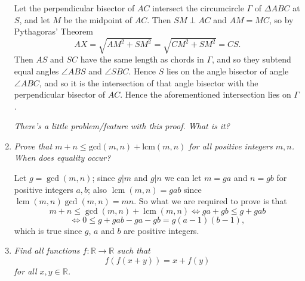 \documentclass{article}
\DeclareMathOperator{\lcm}{lcm}
\begin{document}
\begin{enumerate}[1.]
Let the perpendicular bisector of $AC$ intersect the circumcircle $\Gamma$ of $\Delta ABC$ at $S$, and let $M$ be the midpoint of $AC$. Then $SM \perp AC$ and $AM = MC$, so by Pythagoras' Theorem \[ AX = \sqrt{AM^2+SM^2} = \sqrt{CM^2+SM^2} = CS. \]
Then $AS$ and $SC$ have the same length as chords in $\Gamma$, and so they subtend equal angles $\angle ABS$ and $\angle SBC$. Hence $S$ lies on the angle bisector of angle $\angle ABC$, and so it is the intersection of that angle bisector with the perpendicular bisector of $AC$. Hence the aforementioned intersection lies on $\Gamma$.

\begin{figure}[htb!] \begin{center}
\end{center} \end{figure}

{\footnotesize \textit{There's a little problem/feature with this proof. What is it?}}


\vspace{12pt}
\item %
\textit{Prove that $m + n \leq \textrm{gcd}(m, n) + \textrm{lcm}(m, n)$ for all positive integers $m, n$. When does equality occur?}

Let $g = \gcd(m,n)$; since $g | m$ and $g | n$ we can let $m = ga$ and $n = gb$ for positive integers $a,b$; also $\lcm(m,n) = gab$ since $\lcm(m,n) \gcd(m,n) = mn$. So what we are required to prove is that \[ m+n \leq \gcd(m,n)+\lcm(m,n) \iff ga +gb \leq g +gab \]
\[ \iff 0 \leq g +gab -ga -gb = g(a-1)(b-1), \] which is true since $g$, $a$ and $b$ are positive integers.


\vspace{12pt}
\item %
\textit{Find all functions $f : \mathbb{R} \to \mathbb{R}$ such that
$$ f(f(x+y)) = x + f(y) $$
for all $x, y \in \mathbb{R}$.}



\end{enumerate}
\end{document}
